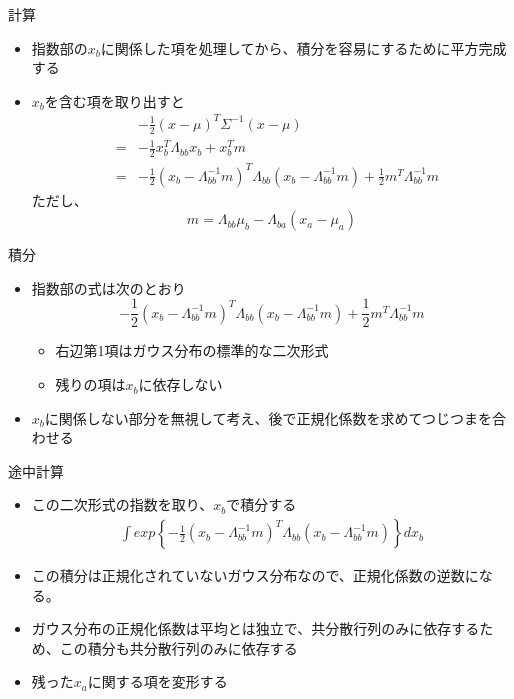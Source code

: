 \begin{frame}{計算}
 \begin{itemize}
  \item 指数部の$x_b$に関係した項を処理してから、積分を容易にするために平方完成する
  \item $x_b$を含む項を取り出すと
        \begin{eqnarray*}
         && -\frac{1}{2}(x - \mu)^{T}\Sigma^{-1}(x-\mu) \\
         &=&-\frac{1}{2}x^T_b\Lambda_{bb}x_b+x^T_bm \\
         &=& -\frac{1}{2}(x_b-\Lambda_{bb}^{-1}m)^T\Lambda_{bb}(x_b-\Lambda_{bb}^{-1}m) + \frac{1}{2}m^T\Lambda_{bb}^{-1}m
        \end{eqnarray*}
        ただし、
        \begin{equation*}
         m =  \Lambda_{bb}\mu_b - \Lambda_{ba}(x_a-\mu_a)
        \end{equation*}
 \end{itemize}
\end{frame}

\begin{frame}{積分}
 \begin{itemize}
  \item 指数部の式は次のとおり
        \begin{equation}
         -\frac{1}{2}(x_b-\Lambda_{bb}^{-1}m)^T\Lambda_{bb}(x_b-\Lambda_{bb}^{-1}m) + \frac{1}{2}m^T\Lambda_{bb}^{-1}m
        \end{equation}
        \begin{itemize}
         \item 右辺第1項はガウス分布の標準的な二次形式
         \item 残りの項は$x_b$に依存しない
        \end{itemize}
  \item $x_b$に関係しない部分を無視して考え、後で正規化係数を求めてつじつまを合わせる
 \end{itemize}
\end{frame}


\begin{frame}{途中計算}
 \begin{itemize}
  \item この二次形式の指数を取り、$x_b$で積分する
        \begin{eqnarray}
         \int exp\left\{-\frac{1}{2}(x_b-\Lambda_{bb}^{-1}m)^T\Lambda_{bb}(x_b-\Lambda_{bb}^{-1}m)\right\}dx_b
        \end{eqnarray}
  \item この積分は正規化されていないガウス分布なので、正規化係数の逆数になる。
  \item ガウス分布の正規化係数は平均とは独立で、共分散行列のみに依存するため、この積分も共分散行列のみに依存する
  \item 残った$x_a$に関する項を変形する
 \end{itemize}
\end{frame}

